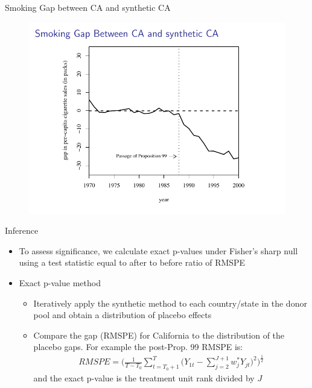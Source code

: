 \documentclass{beamer}
\begin{document}
\begin{frame}{Smoking Gap between CA and synthetic CA}
	
	\begin{figure}
	\includegraphics[scale=0.75]{./lecture_includes/abadie_6.pdf}
	\end{figure}
\end{frame}

\begin{frame}{Inference}
	
	\begin{itemize}
	\item To assess significance, we calculate exact p-values under Fisher's sharp null using a test statistic equal to after to before ratio of RMSPE
	\item Exact p-value method
		\begin{itemize}
		\item Iteratively apply the synthetic method to each country/state in the donor pool and obtain a distribution of placebo effects
		\item Compare the gap (RMSPE) for California to the distribution of the placebo gaps. For example the post-Prop. 99 RMSPE is: 
			\begin{eqnarray*}
			RMSPE = \bigg(\frac{1}{T-T_0} \sum_{t=T_0+1}^T \bigg(Y_{1t} - \sum_{j=2}^{J+1} w_j^* Y_{jt}\bigg)^2 \bigg)^{\frac{1}{2}}
			\end{eqnarray*}and the exact p-value is the treatment unit rank divided by $J$
		\end{itemize}
	\end{itemize}
\end{frame}
\end{document}
